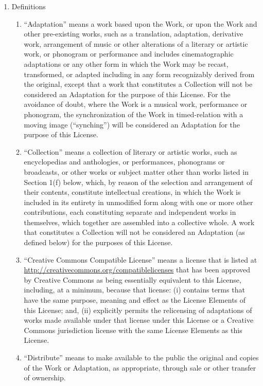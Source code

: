 \documentclass[letterpaper,10pt,english]{manual}
\begin{document}
\begin{enumerate}
\item {} 
Definitions
\begin{enumerate}
\item {} 
``Adaptation'' means a work based upon the Work, or upon the Work and other pre-existing works, such as a translation, adaptation, derivative work, arrangement of music or other alterations of a literary or artistic work, or phonogram or performance and includes cinematographic adaptations or any other form in which the Work may be recast, transformed, or adapted including in any form recognizably derived from the original, except that a work that constitutes a Collection will not be considered an Adaptation for the purpose of this License. For the avoidance of doubt, where the Work is a musical work, performance or phonogram, the synchronization of the Work in timed-relation with a moving image (``synching'') will be considered an Adaptation for the purpose of this License.

\item {} 
``Collection'' means a collection of literary or artistic works, such as encyclopedias and anthologies, or performances, phonograms or broadcasts, or other works or subject matter other than works listed in Section 1(f) below, which, by reason of the selection and arrangement of their contents, constitute intellectual creations, in which the Work is included in its entirety in unmodified form along with one or more other contributions, each constituting separate and independent works in themselves, which together are assembled into a collective whole. A work that constitutes a Collection will not be considered an Adaptation (as defined below) for the purposes of this License.

\item {} 
``Creative Commons Compatible License'' means a license that is listed at \href{http://creativecommons.org/compatiblelicenses}{http://creativecommons.org/compatiblelicenses} that has been approved by Creative Commons as being essentially equivalent to this License, including, at a minimum, because that license: (i) contains terms that have the same purpose, meaning and effect as the License Elements of this License; and, (ii) explicitly permits the relicensing of adaptations of works made available under that license under this License or a Creative Commons jurisdiction license with the same License Elements as this License.

\item {} 
``Distribute'' means to make available to the public the original and copies of the Work or Adaptation, as appropriate, through sale or other transfer of ownership.


\end{enumerate}
\end{enumerate}
\end{document}
